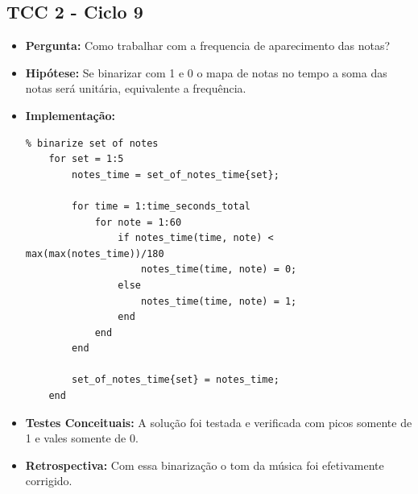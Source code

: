 \subsection{TCC 2 - Ciclo 9}
\begin{itemize}
\item \textbf{Pergunta:} Como trabalhar com a frequencia de aparecimento das notas?
\item \textbf{Hipótese:} Se binarizar com 1 e 0 o mapa de notas no tempo a soma das notas será unitária, equivalente a frequência.
\item \textbf{Implementação:} 
\begin{lstlisting}
% binarize set of notes
    for set = 1:5
        notes_time = set_of_notes_time{set};
        
        for time = 1:time_seconds_total
            for note = 1:60
                if notes_time(time, note) < max(max(notes_time))/180
                    notes_time(time, note) = 0;
                else
                    notes_time(time, note) = 1;
                end
            end
        end

        set_of_notes_time{set} = notes_time;
    end
\end{lstlisting}
\item \textbf{Testes Conceituais:} A solução foi testada e verificada com picos somente de 1 e vales somente de 0. 
\item \textbf{Retrospectiva:} Com essa binarização o tom da música foi efetivamente corrigido.
\end{itemize}

